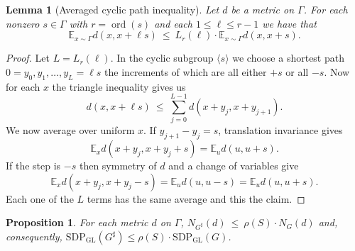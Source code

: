 \documentclass[11pt]{article}
\newtheorem{lemma}[theorem]{Lemma}
\newtheorem{proposition}[theorem]{Proposition}
\theoremstyle{definition}
\theoremstyle{remark}
\newcommand{\E}{\mathbb{E}}
\newcommand{\Z}{\mathbb{Z}}
\newcommand{\ord}{\operatorname{ord}}
\newcommand{\gl}{\operatorname{SDP_{GL}}}
\begin{document}


\begin{lemma}[Averaged cyclic path inequality]\label{lem:averaged-path}
Let $d$ be a metric on $\Gamma$. For each nonzero $s\in\Gamma$ with $r=\ord(s)$ and each $1\leq \ell \leq r-1$ we have that
\begin{equation}\label{eq:averaged-path}
  \E_{x\sim\Gamma}d(x,x+\ell s)
  ~\leq~ L_r(\ell) \cdot \E_{x\sim\Gamma}d(x,x+s).
\end{equation}
\end{lemma}

\begin{proof}
Let $L=L_r(\ell)$. In the cyclic subgroup $\langle s\rangle$ we choose a shortest path $0=y_0,y_1,\ldots,y_L=\ell s$ the increments of which are all either $+s$ or all $-s$. Now for each $x$ the triangle inequality gives us
\[
  d(x,x+\ell s)
  ~\leq~ \sum_{j=0}^{L-1}d(x+y_j,x+y_{j+1}).
\]
We now average over uniform $x$. If $y_{j+1}-y_j=s$, translation invariance gives
\[
  \E_x d(x+y_j,x+y_j+s)=\E_u d(u,u+s).
\]
If the step is $-s$ then symmetry of $d$ and a change of variables give
\[
  \E_xd(x+y_j,x+y_j-s)=\E_ud(u,u-s)=\E_ud(u,u+s).
\]
Each one of the $L$ terms has the same average and this the claim.
\end{proof}

\begin{proposition}\label{prop:metric-averaging}
For each metric $d$ on $\Gamma$,  $N_{G^\sharp}(d)  ~\leq~ \rho(S) \cdot N_G(d)$
and, consequently, $\gl(G^\sharp) \leq \rho(S) \cdot \gl(G)$.
\end{proposition}
\end{document}

